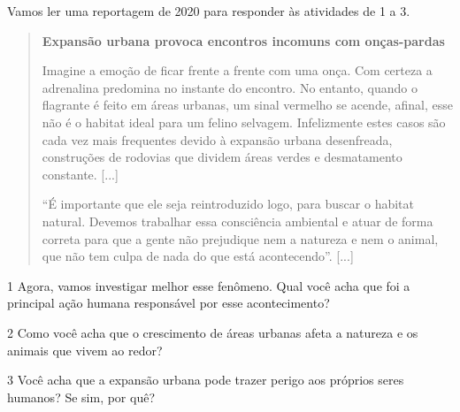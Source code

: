 \begin{itemize}
\begin{itemize}

Vamos ler uma reportagem de 2020 para responder às atividades de 1 a 3.

\begin{quote}
\textbf{Expansão urbana provoca encontros incomuns com onças-pardas}

Imagine a emoção de ficar frente a frente com uma onça. Com certeza a
adrenalina predomina no instante do encontro. No entanto, quando o
flagrante é feito em áreas urbanas, um sinal vermelho se acende, afinal,
esse não é o habitat ideal para um felino selvagem. Infelizmente estes
casos são cada vez mais frequentes devido à expansão urbana desenfreada,
construções de rodovias que dividem áreas verdes e desmatamento
constante. [...]

``É importante que ele seja reintroduzido logo, para buscar o habitat
natural. Devemos trabalhar essa consciência ambiental e atuar de forma
correta para que a gente não prejudique nem a natureza e nem o animal,
que não tem culpa de nada do que está acontecendo''. [...]

\end{quote}

\num{1} Agora, vamos investigar melhor esse fenômeno. Qual você acha que foi a principal ação humana responsável por esse acontecimento?


\num{2} Como você acha que o crescimento de áreas urbanas afeta a natureza e os
animais que vivem ao redor?


\num{3} Você acha que a expansão urbana pode trazer perigo aos próprios seres
humanos? Se sim, por quê?



\end{itemize}
\end{itemize}
